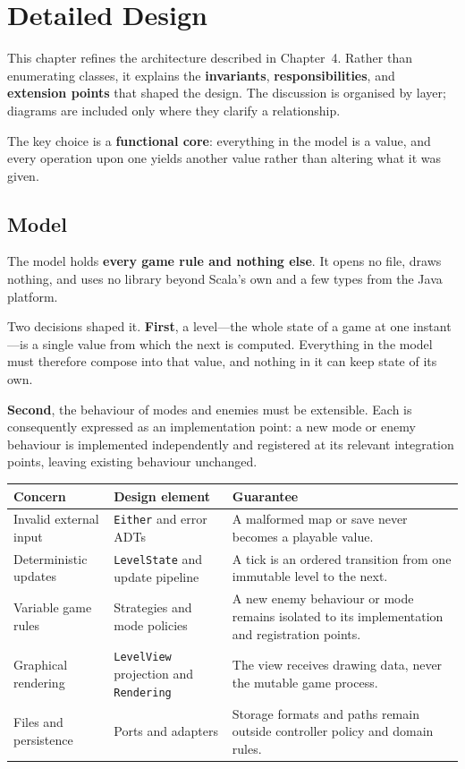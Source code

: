 \chapter{Detailed Design}

This chapter refines the architecture described in Chapter~4. Rather than enumerating classes, it explains the
\textbf{invariants}, \textbf{responsibilities}, and \textbf{extension points} that shaped the design. The discussion
is organised by layer; diagrams are included only where they clarify a relationship.

The key choice is a \textbf{functional core}: everything in the model is a value, and every operation upon one yields
another value rather than altering what it was given.

\section{Model}

The model holds \textbf{every game rule and nothing else}. It opens no file, draws nothing, and uses no library beyond
Scala's own and a few types from the Java platform.

Two decisions shaped it. \textbf{First}, a level---the whole state of a game at one instant---is a single value from
which the next is computed. Everything in the model must therefore compose into that value, and nothing in it can keep
state of its own.

\textbf{Second}, the behaviour of modes and enemies must be extensible. Each is consequently expressed as an
implementation point: a new mode or enemy behaviour is implemented independently and registered at its relevant
integration points, leaving existing behaviour unchanged.

\begin{center}
  \small
  \begin{tabular}{|p{3cm}|p{3.4cm}|p{5.2cm}|}
    \hline
    \textbf{Concern} & \textbf{Design element} & \textbf{Guarantee} \\
    \hline
    Invalid external input & \texttt{Either} and error ADTs & A malformed map or save never becomes a playable value. \\
    \hline
    Deterministic updates & \texttt{LevelState} and update pipeline & A tick is an ordered transition from one immutable level to the next. \\
    \hline
    Variable game rules & Strategies and mode policies & A new enemy behaviour or mode remains isolated to its implementation and registration points. \\
    \hline
    Graphical rendering & \texttt{LevelView} projection and \texttt{Rendering} & The view receives drawing data, never the mutable game process. \\
    \hline
    Files and persistence & Ports and adapters & Storage formats and paths remain outside controller policy and domain rules. \\
    \hline
  \end{tabular}
\end{center}

